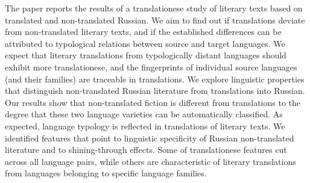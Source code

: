 The paper reports the results of a translationese study of literary texts based on translated and non-translated Russian. We aim to find out if translations deviate from non-translated literary texts, and if the established differences can be attributed to typological relations between source and target languages. We expect that literary translations from typologically distant languages should exhibit more translationese, and the fingerprints of individual source languages (and their families) are traceable in translations. We explore linguistic properties that distinguish non-translated Russian literature from translations into Russian. Our results show that non-translated fiction is different from translations to the degree that these two language varieties can be automatically classified. As expected, language typology is reflected in translations of literary texts. We identified features that point to linguistic specificity of Russian  non-translated literature and to shining-through effects. Some of translationese features cut across all language pairs, while others are characteristic of literary translations from languages belonging to specific language families.
